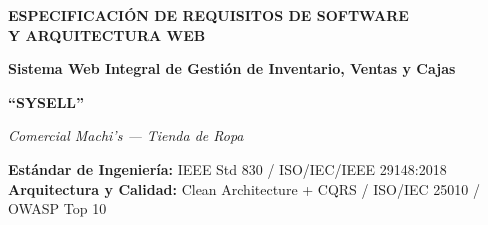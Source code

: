 \begin{titlepage}
\begin{center}
        \vspace{1.0cm}
        {\fontsize{18}{24}\selectfont\bfseries\color{PrimaryBlue} ESPECIFICACIÓN DE REQUISITOS DE SOFTWARE\\ Y ARQUITECTURA WEB\par}
        
        \vspace{0.5cm}
        {\Large\bfseries\color{SecondaryBlue} Sistema Web Integral de Gestión de Inventario, Ventas y Cajas\par}
        
        \vspace{0.4cm}
        {\huge\textbf{\color{PrimaryBlue}``SYSELL''}\par}
        
        \vspace{0.3cm}
        {\large\itshape Comercial Machi's --- Tienda de Ropa\par}
        
        \vspace{0.6cm}
        \begin{tcolorbox}[colback=LightSlate,colframe=BorderGray,width=0.88\linewidth,arc=3pt,boxrule=0.8pt]
            \centering\small
            \textbf{Estándar de Ingeniería:} IEEE Std 830 / ISO/IEC/IEEE 29148:2018\\[0.1cm]
            \textbf{Arquitectura y Calidad:} Clean Architecture + CQRS / ISO/IEC 25010 / OWASP Top 10
        \end{tcolorbox}


\end{center}
\end{titlepage}
